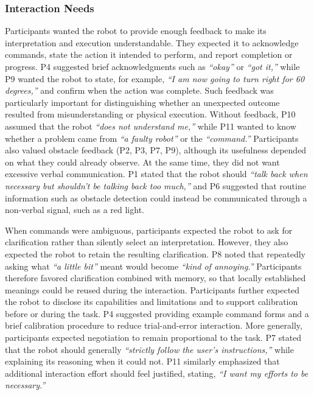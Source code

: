 \subsubsection{Interaction Needs}
Participants wanted the robot to provide enough feedback to make its interpretation and execution understandable. They expected it to acknowledge commands, state the action it intended to perform, and report completion or progress. P4 suggested brief acknowledgments such as \emph{``okay''} or \emph{``got it,''} while P9 wanted the robot to state, for example, \emph{``I am now going to turn right for 60 degrees,''} and confirm when the action was complete. Such feedback was particularly important for distinguishing whether an unexpected outcome resulted from misunderstanding or physical execution. Without feedback, P10 assumed that the robot \emph{``does not understand me,''} while P11 wanted to know whether a problem came from \emph{``a faulty robot''} or the \emph{``command.''} Participants also valued obstacle feedback (P2, P3, P7, P9), although its usefulness depended on what they could already observe. At the same time, they did not want excessive verbal communication. P1 stated that the robot should \emph{``talk back when necessary but shouldn't be talking back too much,''} and P6 suggested that routine information such as obstacle detection could instead be communicated through a non-verbal signal, such as a red light.

When commands were ambiguous, participants expected the robot to ask for clarification rather than silently select an interpretation. However, they also expected the robot to retain the resulting clarification. P8 noted that repeatedly asking what \emph{``a little bit''} meant would become \emph{``kind of annoying.''} Participants therefore favored clarification combined with memory, so that locally established meanings could be reused during the interaction. Participants further expected the robot to disclose its capabilities and limitations and to support calibration before or during the task. P4 suggested providing example command forms and a brief calibration procedure to reduce trial-and-error interaction. More generally, participants expected negotiation to remain proportional to the task. P7 stated that the robot should generally \emph{``strictly follow the user's instructions,''} while explaining its reasoning when it could not. P11 similarly emphasized that additional interaction effort should feel justified, stating, \emph{``I want my efforts to be necessary.''}